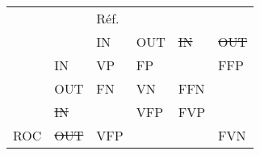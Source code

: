 \begin{tabular}{|ll|llll|}
\hline
\multicolumn{2}{|l|}{}                                                   & \multicolumn{4}{l|}{Réf.}                                                                                                                                                \\ \cline{3-6} 
\multicolumn{2}{|l|}{\multirow{-2}{*}{}}                                 & \multicolumn{1}{l|}{IN}                       & \multicolumn{1}{l|}{OUT}                      & \multicolumn{1}{l|}{\sout{IN}}          & \sout{OUT}         \\ \hline
\multicolumn{1}{|l|}{}                      & IN                         & \multicolumn{1}{l|}{VP}                       & \multicolumn{1}{l|}{FP}                       & \multicolumn{1}{l|}{\cellcolor[HTML]{000000}} & FFP                      \\ \cline{2-6} 
\multicolumn{1}{|l|}{}                      & {\color[HTML]{000000} OUT} & \multicolumn{1}{l|}{FN}                       & \multicolumn{1}{l|}{VN}                       & \multicolumn{1}{l|}{FFN}                      & \cellcolor[HTML]{000000} \\ \cline{2-6} 
\multicolumn{1}{|l|}{}                      & \sout{IN}             & \multicolumn{1}{l|}{\cellcolor[HTML]{000000}} & \multicolumn{1}{l|}{VFP}                      & \multicolumn{1}{l|}{FVP}                      & \cellcolor[HTML]{000000} \\ \cline{2-6} 
\multicolumn{1}{|l|}{\multirow{-4}{*}{ROC}} & \sout{OUT}           & \multicolumn{1}{l|}{VFP}                      & \multicolumn{1}{l|}{\cellcolor[HTML]{000000}} & \multicolumn{1}{l|}{\cellcolor[HTML]{000000}} & FVN                      \\ \hline
\end{tabular}